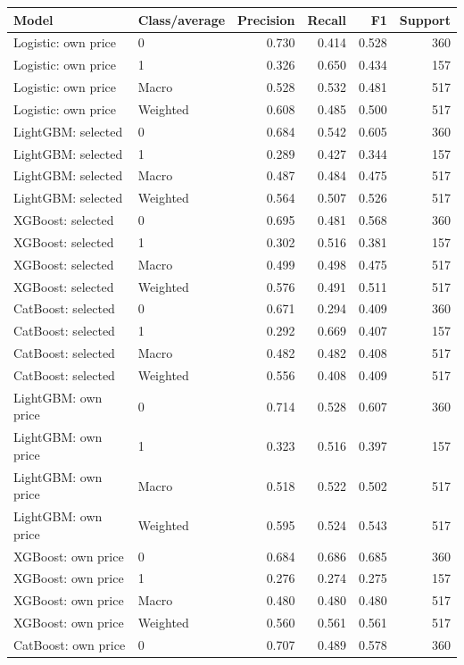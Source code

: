 \begin{longtable}{@{}p{.34\linewidth}p{.15\linewidth}rrrr@{}}
\toprule Model & Class/average & Precision & Recall & F1 & Support\\\midrule\endhead
Logistic: own price & 0 & 0.730 & 0.414 & 0.528 & 360\\
Logistic: own price & 1 & 0.326 & 0.650 & 0.434 & 157\\
Logistic: own price & Macro & 0.528 & 0.532 & 0.481 & 517\\
Logistic: own price & Weighted & 0.608 & 0.485 & 0.500 & 517\\
LightGBM: selected & 0 & 0.684 & 0.542 & 0.605 & 360\\
LightGBM: selected & 1 & 0.289 & 0.427 & 0.344 & 157\\
LightGBM: selected & Macro & 0.487 & 0.484 & 0.475 & 517\\
LightGBM: selected & Weighted & 0.564 & 0.507 & 0.526 & 517\\
XGBoost: selected & 0 & 0.695 & 0.481 & 0.568 & 360\\
XGBoost: selected & 1 & 0.302 & 0.516 & 0.381 & 157\\
XGBoost: selected & Macro & 0.499 & 0.498 & 0.475 & 517\\
XGBoost: selected & Weighted & 0.576 & 0.491 & 0.511 & 517\\
CatBoost: selected & 0 & 0.671 & 0.294 & 0.409 & 360\\
CatBoost: selected & 1 & 0.292 & 0.669 & 0.407 & 157\\
CatBoost: selected & Macro & 0.482 & 0.482 & 0.408 & 517\\
CatBoost: selected & Weighted & 0.556 & 0.408 & 0.409 & 517\\
LightGBM: own price & 0 & 0.714 & 0.528 & 0.607 & 360\\
LightGBM: own price & 1 & 0.323 & 0.516 & 0.397 & 157\\
LightGBM: own price & Macro & 0.518 & 0.522 & 0.502 & 517\\
LightGBM: own price & Weighted & 0.595 & 0.524 & 0.543 & 517\\
XGBoost: own price & 0 & 0.684 & 0.686 & 0.685 & 360\\
XGBoost: own price & 1 & 0.276 & 0.274 & 0.275 & 157\\
XGBoost: own price & Macro & 0.480 & 0.480 & 0.480 & 517\\
XGBoost: own price & Weighted & 0.560 & 0.561 & 0.561 & 517\\
CatBoost: own price & 0 & 0.707 & 0.489 & 0.578 & 360\\

\end{longtable}
